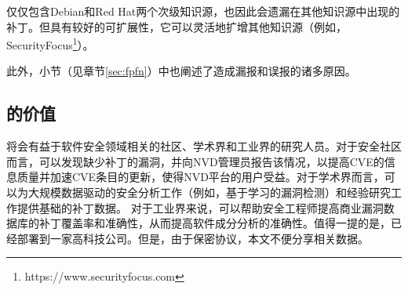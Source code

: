 \tool 仅仅包含Debian和Red Hat两个次级知识源，也因此会遗漏在其他知识源中出现的补丁。但\tool 具有较好的可扩展性，它可以灵活地扩增其他知识源（例如，SecurityFocus\footnote{https://www.securityfocus.com}）。

此外，小节（见章节\ref{sec:fpfn}）中也阐述了造成\tool 漏报和误报的诸多原因。

\subsection{\tool 的价值}
\tool 将会有益于软件安全领域相关的社区、学术界和工业界的研究人员。对于安全社区而言，\tool 可以发现缺少补丁的漏洞，并向NVD管理员报告该情况，以提高CVE的信息质量并加速CVE条目的更新，使得NVD平台的用户受益。对于学术界而言，\tool 可以为大规模数据驱动的安全分析工作（例如，基于学习的漏洞检测\cite{li2018vuldeepecker,zhou2019devign}）和经验研究工作提供基础的补丁数据。%
对于工业界来说，\tool 可以帮助安全工程师提高商业漏洞数据库的补丁覆盖率和准确性，从而提高软件成分分析的准确性。值得一提的是，\tool 已经部署到一家高科技公司。但是，由于保密协议，本文不便分享相关数据。